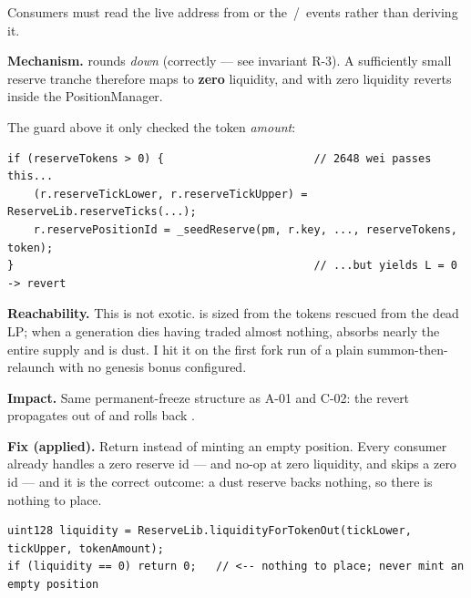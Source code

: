 \noindent Consumers must read the live address from  or the
\,/\, events rather than deriving it.



\textbf{Mechanism.}  rounds \emph{down}
(correctly --- see invariant R-3). A sufficiently small reserve tranche therefore
maps to \textbf{zero} liquidity, and  with zero liquidity
reverts  inside the PositionManager.

The guard above it only checked the token \emph{amount}:

\begin{lstlisting}[firstnumber=258]
if (reserveTokens > 0) {                       // 2648 wei passes this...
    (r.reserveTickLower, r.reserveTickUpper) = ReserveLib.reserveTicks(...);
    r.reservePositionId = _seedReserve(pm, r.key, ..., reserveTokens, token);
}                                              // ...but yields L = 0 -> revert
\end{lstlisting}

\textbf{Reachability.} This is not exotic.  is sized from the
tokens rescued from the dead LP; when a generation dies having traded almost
nothing,  absorbs nearly the entire supply and
 is dust. I hit it on the first
fork run of a plain summon-then-relaunch with no genesis bonus configured.

\textbf{Impact.} Same permanent-freeze structure as A-01 and C-02: the revert
propagates out of  and rolls back .

\textbf{Fix (applied).} Return  instead of minting an empty position.
Every consumer already handles a zero reserve id ---  and
 no-op at zero liquidity, and  skips a
zero id --- and it is the correct outcome: a dust reserve backs nothing, so there
is nothing to place.

\begin{lstlisting}[numbers=none]
uint128 liquidity = ReserveLib.liquidityForTokenOut(tickLower, tickUpper, tokenAmount);
if (liquidity == 0) return 0;   // <-- nothing to place; never mint an empty position
\end{lstlisting}

